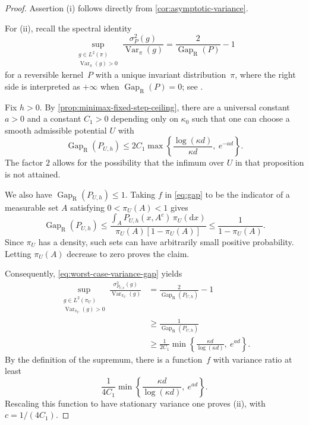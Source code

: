 \documentclass[11pt]{article}
\newcommand{\Var}{\operatorname{Var}}
\newcommand{\Gap}{\operatorname{Gap}_{\mathrm{R}}}
\newcommand{\1}{\mathbf 1}
\newcommand{\df}{\mathrm{d}}
\begin{document}
	\begin{proof}
		Assertion (i) follows directly from \cref{cor:asymptotic-variance}.
		
		For (ii), recall the spectral identity
		\begin{equation}\label{eq:worst-case-variance-gap}
			\sup_{\substack{g\in L^2(\pi)\\\Var_\pi(g)>0}}
			\frac{\sigma_P^2(g)}{\Var_\pi(g)}
			=\frac{2}{\Gap(P)}-1
		\end{equation}
		for a reversible kernel~$P$ with a unique invariant distribution~$\pi$,
		where the right side is interpreted as $+\infty$ when
		$\Gap(P)=0$; see
		\citet{KipnisVaradhan1986,RobertsRosenthal2008VarianceBounding}.
		
		Fix $h>0$. By \cref{prop:minimax-fixed-step-ceiling}, there are a
		universal constant $a>0$ and a constant $C_1>0$ depending only on
		$\kappa_0$ such that one can choose a smooth admissible potential
		$U$ with
		\[
		\Gap(P_{U,h})
		\leq 2C_1\max\left\{
		\frac{\log(\kappa d)}{\kappa d},\ e^{-ad}
		\right\}.
		\]
		The factor $2$ allows for the possibility that the infimum over
		$U$ in that proposition is not attained.
		
		We also have $\Gap(P_{U,h})\leq1$. Taking $f$ in \eqref{eq:gap} to be the indicator of a measurable set $A$ satisfying
		$0<\pi_U(A)<1$ gives
		\[
		\Gap(P_{U,h})
		\leq
		\frac{\int_A P_{U,h}(x,A^c)\,\pi_U(\df x)}
		{\pi_U(A)[1-\pi_U(A)]}
		\leq\frac1{1-\pi_U(A)}.
		\]
		Since $\pi_U$ has a density, such sets can have arbitrarily small
		positive probability. Letting $\pi_U(A)$ decrease to zero proves
		the claim.
		
		Consequently, \eqref{eq:worst-case-variance-gap} yields
		\[
		\begin{aligned}
			\sup_{\substack{g\in L^2(\pi_U)\\\Var_{\pi_U}(g)>0}}
			\frac{\sigma_{P_{U,h}}^2(g)}{\Var_{\pi_U}(g)}
			&=\frac{2}{\Gap(P_{U,h})}-1\\
			&\geq\frac1{\Gap(P_{U,h})}\\
			&\geq\frac1{2C_1}
			\min\left\{
			\frac{\kappa d}{\log(\kappa d)},\ e^{ad}
			\right\}.
		\end{aligned}
		\]
		By the definition of the supremum, there is a function~$f$ with
		variance ratio at least
		\[
		\frac1{4C_1}\min\left\{
		\frac{\kappa d}{\log(\kappa d)},\ e^{ad}
		\right\}.
		\]
		Rescaling this function to have stationary variance one proves
		(ii), with $c=1/(4C_1)$.
	\end{proof}
	
\end{document}
